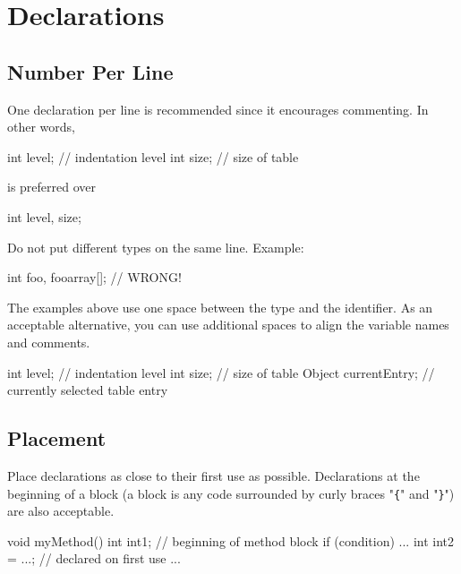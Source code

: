 \documentclass{article}
\newenvironment{note}[1]
  {\begin{notes}\item #1}{\end{notes}}
\begin{document}
\section{Declarations}

\subsection{Number Per Line}

One declaration per line is recommended since it encourages commenting. In other words,

\begin{snippet}
int level; // indentation level
int size;  // size of table
\end{snippet}

is preferred over

\begin{snippet}
int level, size;
\end{snippet}

Do not put different types on the same line. Example:

\begin{snippet}
int foo, fooarray[]; // WRONG!
\end{snippet}

\begin{note}
The examples above use one space between the type and the identifier. As an acceptable alternative,
you can use additional spaces to align the variable names and comments.

\begin{snippet}
int    level;        // indentation level
int    size;         // size of table
Object currentEntry; // currently selected table entry
\end{snippet}
\end{note}

\subsection{Placement}

Place declarations as close to their first use as possible. Declarations at the beginning of a
block (a block is any code surrounded by curly braces "\texttt{\{}" and "\texttt{\}}") are also
acceptable.

\begin{snippet}
void myMethod() {
    int int1;            // beginning of method block
    if (condition) {
        ...
        int int2 = ...;  // declared on first use
        ...
    }
}
\end{snippet}
\end{document}
